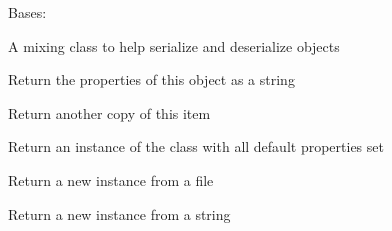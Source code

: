 \documentclass[letterpaper,10pt,english]{sphinxmanual}
\begin{document}
\begin{fulllineitems}
\label{common:serge.serialize.Serializable}
Bases: 

A mixing class to help serialize and deserialize objects

\begin{fulllineitems}
\label{common:serge.serialize.Serializable.asString}
Return the properties of this object as a string

\end{fulllineitems}


\begin{fulllineitems}
\label{common:serge.serialize.Serializable.copy}
Return another copy of this item

\end{fulllineitems}


\begin{fulllineitems}
\label{common:serge.serialize.Serializable.createInstance}
Return an instance of the class with all default properties set

\end{fulllineitems}


\begin{fulllineitems}
\label{common:serge.serialize.Serializable.fromFile}
Return a new instance from a file

\end{fulllineitems}


\begin{fulllineitems}
\label{common:serge.serialize.Serializable.fromString}
Return a new instance from a string


\end{fulllineitems}
\end{fulllineitems}
\end{document}

